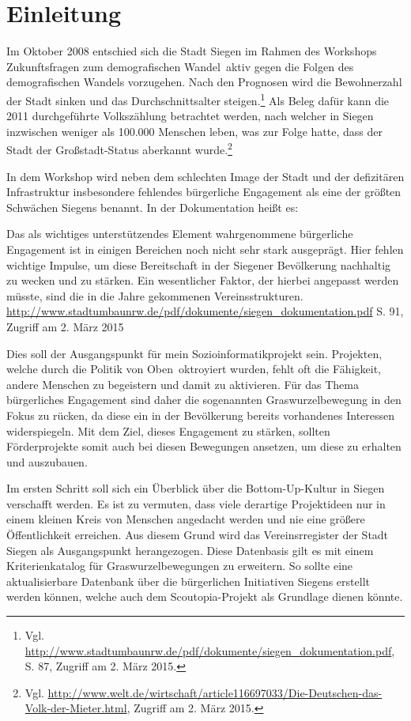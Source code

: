 \section{Einleitung}

Im Oktober 2008 entschied sich die Stadt Siegen im Rahmen des Workshops \glqq Zukunftsfragen zum demografischen Wandel\grqq ~aktiv gegen die Folgen des demografischen Wandels vorzugehen. Nach den Prognosen wird die Bewohnerzahl der Stadt sinken und das Durchschnittsalter steigen.\footnote{Vgl. \url{http://www.stadtumbaunrw.de/pdf/dokumente/siegen_dokumentation.pdf}, S. 87, Zugriff am 2. März 2015.}
Als Beleg dafür kann die 2011 durchgeführte Volkszählung betrachtet werden, nach welcher in Siegen inzwischen weniger als 100.000 Menschen leben, was zur Folge hatte, dass der Stadt der Großstadt-Status aberkannt wurde.\footnote{Vgl. \url{http://www.welt.de/wirtschaft/article116697033/Die-Deutschen-das-Volk-der-Mieter.html}, Zugriff am 2. März 2015.}

In dem Workshop wird neben dem schlechten Image der Stadt und der defizitären Infrastruktur insbesondere fehlendes bürgerliche Engagement als eine der größten Schwächen Siegens benannt. In der Dokumentation heißt es:
\vspace{-0.5cm}



Das als wichtiges unterstützendes Element wahrgenommene bürgerliche Engagement ist in einigen Bereichen noch nicht sehr stark ausgeprägt. Hier fehlen wichtige Impulse, um diese Bereitschaft in der Siegener Bevölkerung nachhaltig zu wecken und zu stärken. Ein wesentlicher Faktor, der hierbei angepasst werden müsste, sind die in die Jahre gekommenen Vereinsstrukturen. \url{http://www.stadtumbaunrw.de/pdf/dokumente/siegen_dokumentation.pdf} 
S. 91, Zugriff am 2. März 2015



Dies soll der Ausgangspunkt für mein Sozioinformatikprojekt sein. Projekten, welche durch die Politik \glqq von Oben\grqq ~oktroyiert wurden, fehlt oft die Fähigkeit, andere Menschen zu begeistern und damit zu aktivieren. Für das Thema bürgerliches Engagement sind daher die sogenannten Graswurzelbewegung in den Fokus zu rücken, da diese ein in der Bevölkerung bereits vorhandenes Interessen widerspiegeln. Mit dem Ziel, dieses Engagement zu stärken, sollten Förderprojekte somit auch bei diesen Bewegungen ansetzen, um diese zu erhalten und auszubauen.

Im ersten Schritt soll sich ein Überblick über die Bottom-Up-Kultur in Siegen verschafft werden. 
Es ist zu vermuten, dass viele derartige Projektideen nur in einem kleinen Kreis von Menschen angedacht werden und nie eine größere Öffentlichkeit erreichen. Aus diesem Grund wird das Vereinsrregister der Stadt Siegen als Ausgangspunkt herangezogen. Diese Datenbasis gilt es mit einem Kriterienkatalog für Graswurzelbewegungen zu erweitern. So sollte eine aktualisierbare Datenbank über die bürgerlichen Initiativen Siegens erstellt werden können, welche auch dem Scoutopia-Projekt als Grundlage dienen könnte.


